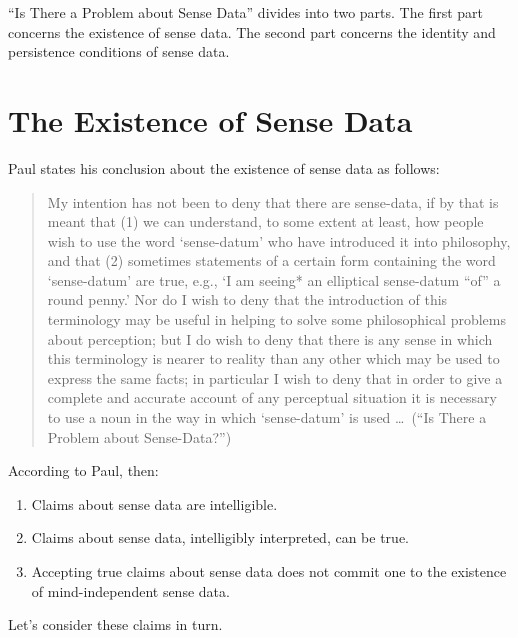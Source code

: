 \documentclass[11pt]{article}
\begin{document}


``Is There a Problem about Sense Data'' divides into two parts. The first part concerns the existence of sense data. The second part concerns the identity and persistence conditions of sense data.

\section{The Existence of Sense Data} %
\label{sec:the_existence_of_sense_data}

Paul states his conclusion about the existence of sense data as follows:
\begin{quote}
    My intention has not been to deny that there are sense-data, if by that is meant that (1) we can understand, to some extent at least, how people wish to use the word `sense-datum' who have introduced it into philosophy, and that (2) sometimes statements of a certain form containing the word `sense-datum' are true, e.g., `I am seeing* an elliptical sense-datum ``of'' a round penny.' Nor do I wish to deny that the introduction of this terminology may be useful in helping to solve some philosophical problems about perception; but I do wish to deny that there is any sense in which this terminology is nearer to reality than any other which may be used to express the same facts; in particular I wish to deny that in order to give a complete and accurate account of any perceptual situation it is necessary to use a noun in the way in which `sense-datum' is used \ldots\ (``Is There a Problem about Sense-Data?'')
\end{quote}
According to Paul, then: 
\begin{enumerate}
    \item Claims about sense data are intelligible.
    \item Claims about sense data, intelligibly interpreted, can be true.
    \item Accepting true claims about sense data does not commit one to the existence of mind-independent sense data.
\end{enumerate}
Let's consider these claims in turn.
\end{document}
